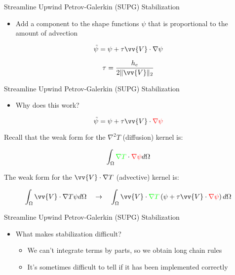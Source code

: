 \documentclass{beamer}
\begin{document}

\begin{frame}{Streamline Upwind Petrov-Galerkin (SUPG) Stabilization}

\begin{itemize}
\item Add a component to the shape functions \(\psi\) that is proportional to the amount of advection
\end{itemize}

\begin{equation}
\tilde{\psi}=\psi+\tau\vv{V}\cdot\nabla \psi
\end{equation}

\begin{equation}
\tau=\frac{h_e}{2\|\vv{V}\|_2}
\end{equation}

\end{frame}

\begin{frame}{Streamline Upwind Petrov-Galerkin (SUPG) Stabilization}

\begin{itemize}
\item Why does this work?
\end{itemize}

\begin{equation}
\tilde{\psi}=\psi+\tau\vv{V}\cdot\color{red}\nabla \psi\color{black}
\end{equation}

Recall that the weak form for the \(\nabla^2 T\) (diffusion) kernel is:

\begin{equation}
\int_{\Omega}^{}\color{green}\nabla T\color{black}\cdot\color{red}\nabla\psi\color{black} d\Omega
\end{equation}

The weak form for the \(\vv{V}\cdot\nabla T\) (advective) kernel is:

\begin{equation}
\int_{\Omega}^{}\vv{V}\cdot\nabla T\psi d\Omega\quad\rightarrow\quad\int_{\Omega}^{}\vv{V}\cdot\color{green}\nabla T\color{black}\left(\psi+\tau\vv{V}\cdot\color{red}\nabla \psi\color{black}\right) d\Omega
\end{equation}

\end{frame}


\begin{frame}{Streamline Upwind Petrov-Galerkin (SUPG) Stabilization}

\begin{itemize}
\item What makes stabilization difficult?
	\begin{itemize}
		\item We can't integrate terms by parts, so we obtain long chain rules
		\item It's sometimes difficult to tell if it has been implemented correctly
	\end{itemize}
\end{itemize}

\end{frame}
\end{document}
